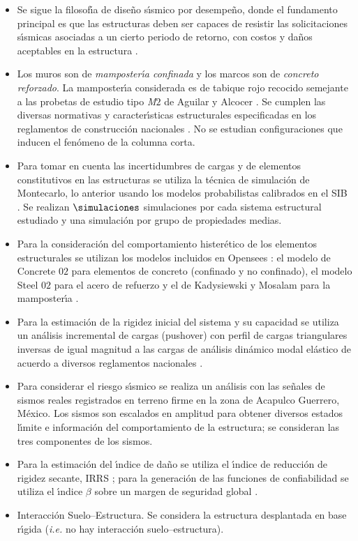 	\begin{itemize}
	
		\item Se sigue la filosof\'{\i}a de dise\~no s\'{\i}smico por desempe\~no, donde el fundamento principal es que las estructuras deben ser capaces de resistir las solicitaciones s\'{\i}smicas asociadas a un cierto periodo de retorno, con costos y da\~nos aceptables en la estructura \cite{SEAOC1995}.
		\item Los muros son de \emph{mamposter\'{\i}a confinada} y los marcos son de \emph{concreto reforzado}. La mamposter\'{\i}a considerada es de tabique rojo recocido semejante a las probetas de estudio tipo \emph{M$2$} de Aguilar y Alcocer \cite{AA2001}. Se cumplen las diversas normativas y caracter\'{\i}sticas estructurales especificadas en los reglamentos de construcci\'on nacionales \cite{CFE1993,NTC2004,NTCII2004}. No se estudian configuraciones que inducen el fen\'omeno de la columna corta.
		\item Para tomar en cuenta las incertidumbres de cargas y de elementos constitutivos en las estructuras se utiliza la t\'ecnica de simulaci\'on de Montecarlo, lo anterior usando los modelos probabilistas calibrados en el SIB \cite{SIB2013}. Se realizan $\simulaciones$ simulaciones por cada sistema estructural estudiado y una simulaci\'on por grupo de propiedades medias.
	  \item Para la consideraci\'on del comportamiento hister\'etico de los elementos estructurales se utilizan los modelos incluidos en Opensees \cite{OP2006}: el modelo de Concrete $02$ para elementos de concreto (confinado y no confinado), el modelo Steel $02$ para el acero de refuerzo y el de Kadysiewski y Mosalam para la mamposter\'{\i}a \cite{MOSS2009}.
		\item Para la estimaci\'on de la rigidez inicial del sistema y su capacidad se utiliza un an\'alisis incremental de cargas (pushover) con perfil de cargas triangulares inversas de igual magnitud a las cargas de an\'alisis din\'amico modal el\'astico de acuerdo a diversos reglamentos nacionales \cite{CFE1993,NTC2004,NTCII2004}.
		\item Para considerar el riesgo s\'{\i}smico se realiza un an\'alisis con las se\~nales de sismos reales registrados en terreno firme en la zona de Acapulco Guerrero, M\'exico. Los sismos son escalados en amplitud para obtener diversos estados l\'{\i}mite e informaci\'on del comportamiento de la estructura; se consideran las tres componentes de los sismos.
		
		\item Para la estimaci\'on del \'{\i}ndice de da\~no se utiliza el \'{\i}ndice de reducci\'on de rigidez secante, IRRS \cite{DE2006}; para la generaci\'on de las funciones de confiabilidad se utiliza el \'{\i}ndice $\beta$ sobre un margen de seguridad global \cite{C1969}.
		\item Interacci\'on Suelo--Estructura. Se considera la estructura desplantada en base r\'{\i}gida (\emph{i.e.} no hay interacci\'on suelo--estructura).
 \end{itemize}

